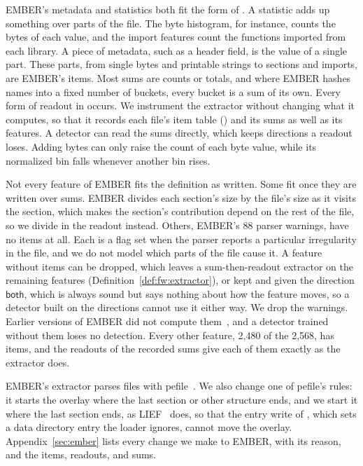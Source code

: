 EMBER's metadata and statistics both fit the form of . A statistic adds up something over parts of the file. The byte histogram, for instance, counts the bytes of each value, and the import features count the functions imported from each library. A piece of metadata, such as a header field, is the value of a single part. These parts, from single
bytes and printable strings to sections and imports, are EMBER's items. Most sums are counts or totals, and where EMBER
hashes names into a fixed number of buckets, every bucket is a sum of its own. Every form of readout in  occurs. We instrument the extractor without changing what it
computes, so that it records each file's item table () and its sums as well as its features. A detector can read the sums directly, which keeps directions a readout loses. Adding bytes can only raise the count of each byte value, while its normalized bin falls whenever another bin rises.

Not every feature of EMBER fits the definition as written. Some fit once they are written over sums. EMBER divides each section's size by the file's size as it visits the section, which makes the section's contribution depend on the rest of the file, so we divide in the readout instead. Others, EMBER's 88 parser warnings, have no items at all. Each is a flag set when the parser reports a particular irregularity in the file, and we do not model which parts of the file cause it. A feature without items can be dropped, which leaves a
sum-then-readout extractor on the remaining features (Definition~\ref{def:fw:extractor}), or kept and given the
direction $\mathsf{both}$, which is always sound but says nothing about how the feature moves, so a detector built
on the directions cannot use it either way. We drop the warnings. Earlier versions of EMBER did not compute
them~\cite{joyce2025ember}, and a detector trained without them loses no detection. Every other feature, 2,480 of the 2,568, has items, and the readouts of the recorded sums give
each of them exactly as the extractor does. %

EMBER's extractor parses files with pefile~\cite{pefile}. We also change one of pefile's rules: it starts the overlay where the last section or other structure ends, and we start it
where the last section ends, as LIEF~\cite{lief} does, so that the entry write of ,
which sets a data directory entry the loader ignores, cannot move the overlay. Appendix~\ref{sec:ember} lists every change we make to EMBER, with its reason, and the items, readouts, and sums.

